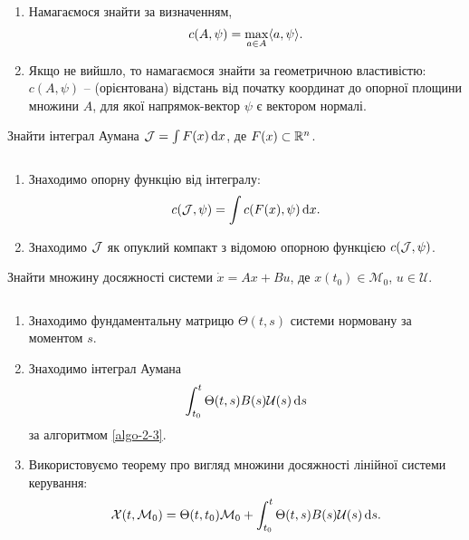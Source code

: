 \begin{algorithm}
	\label{algo-2-2}
	$\left.\right.$
	\begin{enumerate}
		\item Намагаємося знайти за визначенням,
		\begin{equation}
		 	\label{eq:2.4}
		 	c(A,\psi) = \displaystyle\max\limits_{a\in A} \langle a, \psi \rangle.
		\end{equation}
		\item Якщо не вийшло, то намагаємося знайти за геометричною властивістю: $c(A,\psi)$ -- (орієнтована) відстань від початку координат до опорної площини множини $A$, для якої напрямок-вектор $\psi$ є вектором нормалі.
	\end{enumerate}
\end{algorithm}

\vspace*{\baselineskip}

\begin{problem*}
	Знайти інтеграл Аумана $\mathcal{J} = \int F(x) \mathop{}\!\mathrm{d} x$, де $F(x)\subset\mathbb{R}^n$.
\end{problem*}

\begin{algorithm}
	\label{algo-2-3}
	$\left.\right.$
	\begin{enumerate}
		\item Знаходимо опорну функцію від інтегралу:
		\begin{equation}
		 	\label{eq:2.5}
		 	c(\mathcal{J}, \psi) = \int c (F(x), \psi) \mathop{}\!\mathrm{d} x.
		\end{equation}
		\item Знаходимо $\mathcal{J}$ як опуклий компакт з відомою опорною функцією $c(\mathcal{J}, \psi)$.
	\end{enumerate}
\end{algorithm}

\vspace*{\baselineskip}

\begin{problem*}
	Знайти множину досяжності системи $\dot x = A x + B u$, де $x(t_0) \in \mathcal{M}_0$, $u \in \mathcal{U}$.
\end{problem*}

\begin{algorithm}
	\label{algo-2-4}
	$\left.\right.$
	\begin{enumerate}
		\item Знаходимо фундаментальну матрицю $\Theta(t,s)$ системи нормовану за моментом $s$.
		\item Знаходимо інтеграл Аумана
		\begin{equation}
			\label{eq:2.6}
			\int_{t_0}^t \Theta(t, s) B(s) \mathcal{U}(s) \mathop{}\!\mathrm{d} s
		\end{equation}
		за алгоритмом \ref{algo-2-3}.
		\item Використовуємо теорему про вигляд множини досяжності лінійної системи керування:
		\begin{equation}
			\label{eq:2.7}
		 	\mathcal{X}(t, \mathcal{M}_0) = \Theta(t, t_0) \mathcal{M}_0 + \int_{t_0}^t \Theta(t, s)B(s)\mathcal{U}(s) \mathop{}\!\mathrm{d} s.
		\end{equation}
	\end{enumerate}
\end{algorithm}

